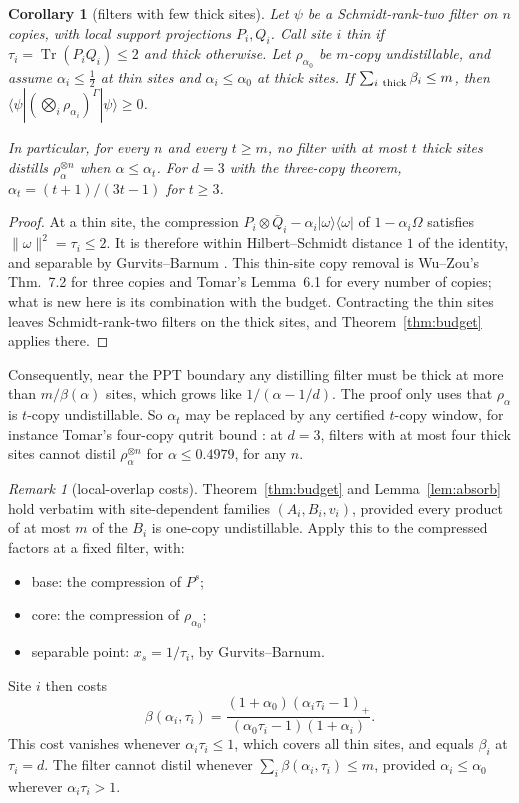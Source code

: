 \documentclass[11pt]{article}
\newtheorem{corollary}[theorem]{Corollary}
\theoremstyle{remark}
\newtheorem{remark}[theorem]{Remark}
\newcommand{\Tr}{\operatorname{Tr}}
\begin{document}
\begin{corollary}[filters with few thick sites]\label{cor:thick}
Let $\psi$ be a Schmidt-rank-two filter on $n$ copies, with local support projections $P_i,Q_i$. Call site $i$
\emph{thin} if $\tau_i=\Tr(P_iQ_i)\le2$ and \emph{thick} otherwise. Let $\rho_{\alpha_0}$ be $m$-copy undistillable,
and assume $\alpha_i\le\frac12$ at thin sites and $\alpha_i\le\alpha_0$ at thick sites. If
$\sum_{i\ \rm thick}\beta_i\le m$, then $\langle\psi|(\bigotimes_i\rho_{\alpha_i})^\Gamma|\psi\rangle\ge0$.

In particular, for every $n$ and every $t\ge m$, no filter with at most $t$ thick sites distills
$\rho_\alpha^{\otimes n}$ when $\alpha\le\alpha_t$. For $d=3$ with the three-copy theorem, $\alpha_t=(t+1)/(3t-1)$ for
$t\ge3$.
\end{corollary}
\begin{proof}
At a thin site, the compression $P_i\otimes\bar Q_i-\alpha_i|\omega\rangle\langle\omega|$ of $1-\alpha_i\Omega$
satisfies $\|\omega\|^2=\tau_i\le2$. It is therefore within Hilbert--Schmidt distance $1$ of the identity, and
separable by Gurvits--Barnum \cite{GB}. This thin-site copy removal is Wu--Zou's Thm.~7.2 \cite{WZ} for three copies and Tomar's Lemma~6.1 \cite{Tomar2} for every number of copies; what is new here is its combination with the budget. Contracting the thin sites leaves Schmidt-rank-two
filters on the thick sites, and Theorem~\ref{thm:budget} applies there.
\end{proof}
Consequently, near the PPT boundary any distilling filter must be thick at more than $m/\beta(\alpha)$ sites, which
grows like $1/(\alpha-1/d)$. The proof only uses that $\rho_\alpha$ is $t$-copy undistillable. So $\alpha_t$ may be
replaced by any certified $t$-copy window, for instance Tomar's four-copy qutrit bound \cite{Tomar}: at $d=3$,
filters with at most four thick sites cannot distil $\rho_\alpha^{\otimes n}$ for $\alpha\le0.4979$, for any $n$.

\begin{remark}[local-overlap costs]
Theorem~\ref{thm:budget} and Lemma~\ref{lem:absorb} hold verbatim with site-dependent families $(A_i,B_i,v_i)$,
provided every product of at most $m$ of the $B_i$ is one-copy undistillable. Apply this to the compressed factors at
a fixed filter, with:
\begin{itemize}
\item base: the compression of $P^s$;
\item core: the compression of $\rho_{\alpha_0}$;
\item separable point: $x_s=1/\tau_i$, by Gurvits--Barnum.
\end{itemize}
Site $i$ then costs
\[
\beta(\alpha_i,\tau_i)=\frac{(1+\alpha_0)(\alpha_i\tau_i-1)_+}{(\alpha_0\tau_i-1)(1+\alpha_i)} .
\]
This cost vanishes whenever $\alpha_i\tau_i\le1$, which covers all thin sites, and equals $\beta_i$ at $\tau_i=d$. The
filter cannot distil whenever $\sum_i\beta(\alpha_i,\tau_i)\le m$, provided $\alpha_i\le\alpha_0$ wherever
$\alpha_i\tau_i>1$.
\end{remark}
\end{document}
